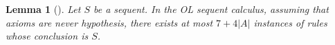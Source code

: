 \documentclass[a4paper, 11pt]{article}
\newtheorem{lemma}[theorem]{Lemma}
\begin{document}
    \begin{lemma}[\cite{10.1145/3632881}]\label{lemma_hyperedges_branching}
	    Let $S$ be a sequent. In the OL sequent calculus, assuming that axioms are never hypothesis, 
	    there exists at most $7+4|A|$ instances of rules whose conclusion is $S$.
    \end{lemma}
\end{document}
